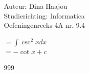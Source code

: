 \documentclass[a4paper]{article}
\begin{document}
\noindent \large Auteur: Dina Haajou \\
\noindent \large Studierichting: Informatica \\
\noindent \large Oefeningenreeks 4A nr. 9.4 \\

\medskip

\normalsize

$= \displaystyle\int \csc^2 x dx$ \\

$= -\cot x + c$ \\

\begin{thebibliography}{999}
\end{thebibliography}
\end{document}
